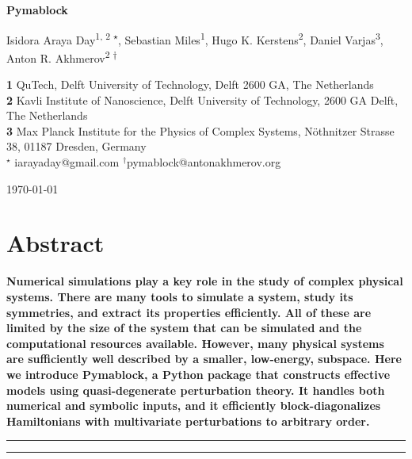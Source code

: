 \documentclass[submission, Codebases]{SciPost}
\begin{document}
\begin{center}
{\Large \textbf{Pymablock}}
\end{center}

\begin{center}
Isidora Araya Day\textsuperscript{1, 2 $\star$},
Sebastian Miles\textsuperscript{1},
Hugo K. Kerstens\textsuperscript{2},
Daniel Varjas\textsuperscript{3},
Anton R. Akhmerov\textsuperscript{2 $\dagger$}
\end{center}

\begin{center}
{\bf 1} QuTech, Delft University of Technology, Delft 2600 GA, The Netherlands \\
{\bf 2} Kavli Institute of Nanoscience, Delft University of Technology, 2600 GA Delft, The Netherlands \\
{\bf 3} Max Planck Institute for the Physics of Complex Systems, Nöthnitzer Strasse 38, 01187 Dresden, Germany \\
${}^\star$ {\small \sf iarayaday@gmail.com}
${}^\dagger${\small \sf pymablock@antonakhmerov.org}
\end{center}

\begin{center}
    \today
\end{center}

\section*{Abstract}
{\bf
Numerical simulations play a key role in the study of complex physical systems.
There are many tools to simulate a system, study its symmetries, and extract its properties efficiently.
All of these are limited by the size of the system that can be simulated and the computational resources available.
However, many physical systems are sufficiently well described by a smaller, low-energy, subspace.
Here we introduce Pymablock, a Python package that constructs effective models using quasi-degenerate perturbation theory.
It handles both numerical and symbolic inputs, and it efficiently block-diagonalizes Hamiltonians with multivariate perturbations to arbitrary order.
}

\vspace{10pt}
\noindent\rule{\textwidth}{1pt}
\tableofcontents\thispagestyle{fancy}
\noindent\rule{\textwidth}{1pt}
\vspace{10pt}

\listoftodos








\printglossaries




\nolinenumbers
\end{document}
